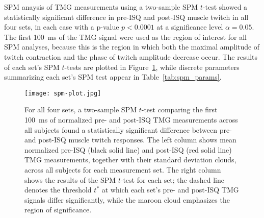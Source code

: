 \documentclass[utf8]{style/FrontiersinHarvard}
\begin{document}
SPM anaysis of TMG measurements using a two-sample SPM $ t $-test showed a statistically significant difference in pre-ISQ and post-ISQ muscle twitch in all four sets, in each case with a p-value $ p < 0.0001 $ at a significance level $ \alpha = 0.05 $.
The first \SI{100}{\milli \second} of the TMG signal were used as the region of interest for all SPM analyses, because this is the region in which both the maximal amplitude of twitch contraction and the phase of twitch amplitude decrease occur.
The results of each set's SPM $ t $-tests are plotted in Figure~\ref{fig:spm_plot}, while discrete parameters summarizing each set's SPM test appear in Table~\ref{tab:spm_params}.

\begin{figure}
	\centering
    \texttt{[image: spm-plot.jpg]}
    \caption{For all four sets, a two-sample SPM $ t $-test comparing the first \SI{100}{\milli \second} of normalized pre- and post-ISQ TMG measurements across all subjects found a statistically significant difference between pre- and post-ISQ muscle twitch responses.
    The left column shows mean normalized pre-ISQ (black solid line) and post-ISQ (red solid line) TMG measurements, together with their standard deviation clouds, across all subjects for each measurement set.
    The right column shows the results of the SPM $ t $-test for each set;
    the dashed line denotes the threshold $ t^{*} $ at which each set's pre- and post-ISQ TMG signals differ significantly, while the maroon cloud emphasizes the region of significance.}
    \label{fig:spm_plot}
\end{figure}

\begin{table}[htb!]
    \centering
    \caption{
        Discrete parameters summarizing the results of the two-sample SPM $ t $-tests show in Figure~\ref{fig:spm_plot}.
        Parameters were introduced in Materials and Methods; for review:
        ``Start time'' is the time at which the SPM $ t $-statistic attains the significance threshold value $ t^{*} $;
        ``End time'' is the time at which the SPM $ t $-statistic falls below the significance threshold value $ t^{*} $;
        ``Centroid time'' and ``Centroid $ t $-value'' give the (time, $ t $) coordinate of the SPM significance region's centroid (the region shown in maroon in Figure~\ref{fig:spm_plot});
        ``SPM maximum'' is maximum value attained by the SPM $ t $-statistic;
        ``Area above threshold'' is area of the SPM significance region.
    }
    \vspace{1ex}

    \renewcommand{\arraystretch}{1.1}
    
    \label{tab:spm_params}
\end{table}
\end{document}
